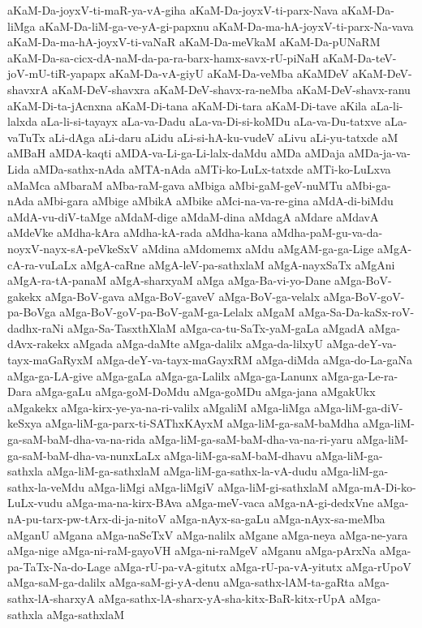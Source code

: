 {aKaM-Da-joyxV-ti-maR-ya-vA-giha
aKaM-Da-joyxV-ti-parx-Nava
aKaM-Da-liMga
aKaM-Da-liM-ga-ve-yA-gi-papxnu
aKaM-Da-ma-hA-joyxV-ti-parx-Na-vava
aKaM-Da-ma-hA-joyxV-ti-vaNaR
aKaM-Da-meVkaM
aKaM-Da-pUNaRM
aKaM-Da-sa-cicx-dA-naM-da-pa-ra-barx-hamx-savx-rU-piNaH
aKaM-Da-teV-joV-mU-tiR-yapapx
aKaM-Da-vA-giyU
aKaM-Da-veMba
aKaMDeV
aKaM-DeV-shavxrA
aKaM-DeV-shavxra
aKaM-DeV-shavx-ra-neMba
aKaM-DeV-shavx-ranu
aKaM-Di-ta-jAcnxna
aKaM-Di-tana
aKaM-Di-tara
aKaM-Di-tave
aKila
aLa-li-lalxda
aLa-li-si-tayayx
aLa-va-Dadu
aLa-va-Di-si-koMDu
aLa-va-Du-tatxve
aLa-vaTuTx
aLi-dAga
aLi-daru
aLidu
aLi-si-hA-ku-vudeV
aLivu
aLi-yu-tatxde
aM
aMBaH
aMDA-kaqti
aMDA-va-Li-ga-Li-lalx-daMdu
aMDa
aMDaja
aMDa-ja-va-Lida
aMDa-sathx-nAda
aMTA-nAda
aMTi-ko-LuLx-tatxde
aMTi-ko-LuLxva
aMaMca
aMbaraM
aMba-raM-gava
aMbiga
aMbi-gaM-geV-nuMTu
aMbi-ga-nAda
aMbi-gara
aMbige
aMbikA
aMbike
aMci-na-va-re-gina
aMdA-di-biMdu
aMdA-vu-diV-taMge
aMdaM-dige
aMdaM-dina
aMdagA
aMdare
aMdavA
aMdeVke
aMdha-kAra
aMdha-kA-rada
aMdha-kana
aMdha-paM-gu-va-da-noyxV-nayx-sA-peVkeSxV
aMdina
aMdomemx
aMdu
aMgAM-ga-ga-Lige
aMgA-cA-ra-vuLaLx
aMgA-caRne
aMgA-leV-pa-sathxlaM
aMgA-nayxSaTx
aMgAni
aMgA-ra-tA-panaM
aMgA-sharxyaM
aMga
aMga-Ba-vi-yo-Dane
aMga-BoV-gakekx
aMga-BoV-gava
aMga-BoV-gaveV
aMga-BoV-ga-velalx
aMga-BoV-goV-pa-BoVga
aMga-BoV-goV-pa-BoV-gaM-ga-Lelalx
aMgaM
aMga-Sa-Da-kaSx-roV-dadhx-raNi
aMga-Sa-TasxthXlaM
aMga-ca-tu-SaTx-yaM-gaLa
aMgadA
aMga-dAvx-rakekx
aMgada
aMga-daMte
aMga-dalilx
aMga-da-lilxyU
aMga-deY-va-tayx-maGaRyxM
aMga-deY-va-tayx-maGayxRM
aMga-diMda
aMga-do-La-gaNa
aMga-ga-LA-give
aMga-gaLa
aMga-ga-Lalilx
aMga-ga-Lanunx
aMga-ga-Le-ra-Dara
aMga-gaLu
aMga-goM-DoMdu
aMga-goMDu
aMga-jana
aMgakUkx
aMgakekx
aMga-kirx-ye-ya-na-ri-valilx
aMgaliM
aMga-liMga
aMga-liM-ga-diV-keSxya
aMga-liM-ga-parx-ti-SAThxKAyxM
aMga-liM-ga-saM-baMdha
aMga-liM-ga-saM-baM-dha-va-na-rida
aMga-liM-ga-saM-baM-dha-va-na-ri-yaru
aMga-liM-ga-saM-baM-dha-va-nunxLaLx
aMga-liM-ga-saM-baM-dhavu
aMga-liM-ga-sathxla
aMga-liM-ga-sathxlaM
aMga-liM-ga-sathx-la-vA-dudu
aMga-liM-ga-sathx-la-veMdu
aMga-liMgi
aMga-liMgiV
aMga-liM-gi-sathxlaM
aMga-mA-Di-ko-LuLx-vudu
aMga-ma-na-kirx-BAva
aMga-meV-vaca
aMga-nA-gi-dedxVne
aMga-nA-pu-tarx-pw-tArx-di-ja-nitoV
aMga-nAyx-sa-gaLu
aMga-nAyx-sa-meMba
aMganU
aMgana
aMga-naSeTxV
aMga-nalilx
aMgane
aMga-neya
aMga-ne-yara
aMga-nige
aMga-ni-raM-gayoVH
aMga-ni-raMgeV
aMganu
aMga-pArxNa
aMga-pa-TaTx-Na-do-Lage
aMga-rU-pa-vA-gitutx
aMga-rU-pa-vA-yitutx
aMga-rUpoV
aMga-saM-ga-dalilx
aMga-saM-gi-yA-denu
aMga-sathx-lAM-ta-gaRta
aMga-sathx-lA-sharxyA
aMga-sathx-lA-sharx-yA-sha-kitx-BaR-kitx-rUpA
aMga-sathxla
aMga-sathxlaM
}
